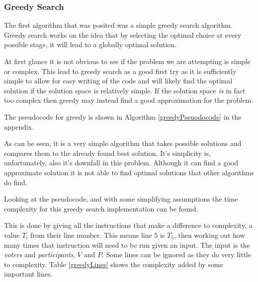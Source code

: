\documentclass[12pt]{report}
\begin{document}
\subsubsection{Greedy Search}
The first algorithm that was posited was a simple greedy search algorithm. Greedy search works on the idea that by selecting the optimal choice at every possible stage, it will lead to a globally optimal solution. 

At first glance it is not obvious to see if the problem we are attempting is simple or complex. This lead to greedy search as a good first try as it is sufficiently simple to allow for easy writing of the code and will likely find the optimal solution if the solution space is relatively simple. If the solution space \textit{is} in fact too complex then greedy may instead find a good approximation for the problem.

The pseudocode for greedy is shown in Algorithm \ref{greedyPseuodocode} in the appendix.

As can be seen, it is a very simple algorithm that takes possible solutions and compares them to the already found best solution. It's simplicity is, unfortunately, also it's downfall in this problem. Although it can find a good approximate solution it is not able to find optimal solutions that other algorithms do find.

Looking at the pseudocode, and with some simplifying assumptions the time complexity for this greedy search implementation can be found.

This is done by giving all the instructions that make a difference to complexity, a value $T_i$ from their line number. This means line 5 is $T_5$, then working out how many times that instruction will need to be run given an input. The input is the \textit{voters} and \textit{participants}, $V$ and $P$. Some lines can be ignored as they do very little to complexity. Table \ref{greedyLines} shows the complexity added by some important lines.
\end{document}
